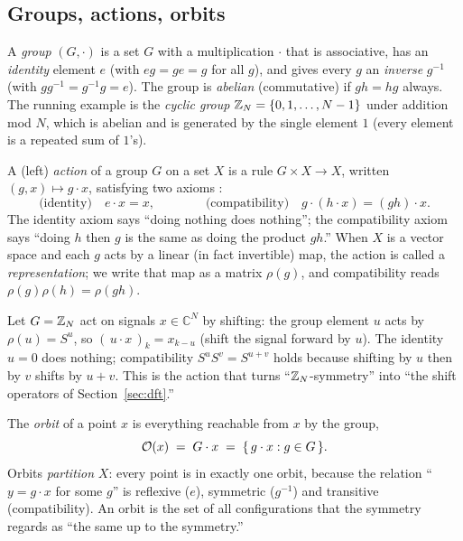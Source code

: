 \subsection{Groups, actions, orbits}

\begin{definition}[Group]
\label{def:group}
A \emph{group} $(G,\cdot)$ is a set $G$ with a multiplication $\cdot$ that is
associative, has an \emph{identity} element $e$ (with $e g = g e = g$ for all $g$), and
gives every $g$ an \emph{inverse} $g^{-1}$ (with $g g^{-1} = g^{-1} g = e$). The group is
\emph{abelian} (commutative) if $g h = h g$ always. The running example is the
\emph{cyclic group} $\mathbb{Z}_N = \{0,1,\dots,N-1\}$ under addition mod $N$, which is abelian
and is generated by the single element $1$ (every element is a repeated sum of $1$'s).
\end{definition}

\begin{definition}
\label{def:action}
A (left) \emph{action} of a group $G$ on a set $X$ is a rule $G \times X \to X$, written
$(g,x) \mapsto g \cdot x$, satisfying two axioms \citep{wiki_groupaction}:
\[
  \text{(identity)}\quad e \cdot x = x, \qquad\qquad
  \text{(compatibility)}\quad g \cdot (h \cdot x) = (g h) \cdot x .
\]
The identity axiom says ``doing nothing does nothing''; the compatibility axiom says
``doing $h$ then $g$ is the same as doing the product $g h$.'' When $X$ is a vector
space and each $g$ acts by a linear (in fact invertible) map, the action is called a
\emph{representation}; we write that map as a matrix $\rho(g)$, and compatibility reads
$\rho(g)\rho(h) = \rho(gh)$.
\end{definition}

\begin{example}
\label{ex:shiftaction}
Let $G = \mathbb{Z}_N$ act on signals $x \in \mathbb{C}^N$ by shifting: the group element $u$
acts by $\rho(u) = S^u$, so $(\,u \cdot x\,)_k = x_{k - u}$ (shift the signal forward by
$u$). The identity $u = 0$ does nothing; compatibility $S^u S^v = S^{u+v}$ holds because
shifting by $u$ then by $v$ shifts by $u + v$. This is the action that turns
``$\mathbb{Z}_N$-symmetry'' into ``the shift operators of Section~\ref{sec:dft}.''
\end{example}

\begin{definition}[Orbit]
\label{def:orbit}
The \emph{orbit} of a point $x$ is everything reachable from $x$ by the group,
\[
  \mathcal O(x) \;=\; G \cdot x \;=\; \{\, g \cdot x : g \in G \,\}.
\]
Orbits \emph{partition} $X$: every point is in exactly one orbit, because the relation
``$y = g\cdot x$ for some $g$'' is reflexive ($e$), symmetric ($g^{-1}$) and transitive
(compatibility). An orbit is the set of all configurations that the symmetry regards as
``the same up to the symmetry.''
\end{definition}

